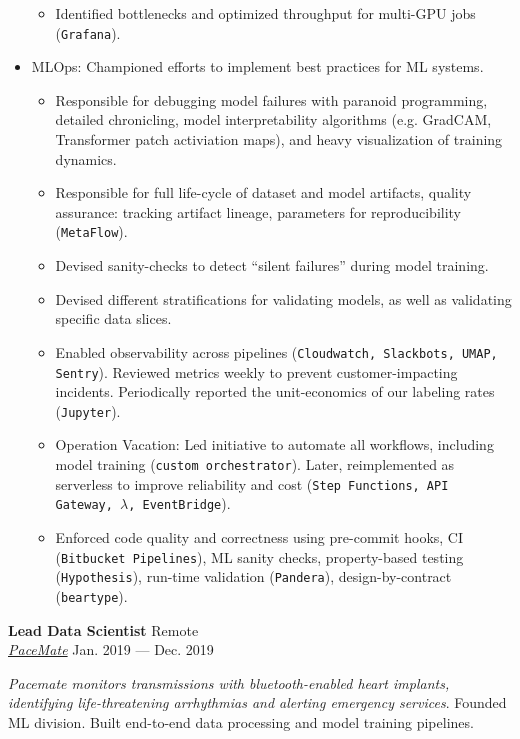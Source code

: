 \documentclass[a4paper,12pt]{article}
\newcommand{\ressubheading}[4]{{\begin{minipage}{\textwidth}
                                    \textbf{#1} \hfill #2 \\
                                    \textit{#3} \hfill #4 \\
\end{minipage}}}
\begin{document}
\begin{itemize}
\begin{itemize}
            \item Identified bottlenecks and optimized throughput for multi-GPU jobs (\texttt{Grafana}).
        \end{itemize}
        \item MLOps: Championed efforts to implement best practices for ML systems.
        \begin{itemize}
            \item Responsible for debugging model failures with paranoid programming, detailed chronicling, model interpretability algorithms (e.g. GradCAM, Transformer patch activiation maps),  and heavy visualization of training dynamics.
            \item Responsible for full life-cycle of dataset and model artifacts, quality assurance:
            tracking artifact lineage, parameters for reproducibility (\texttt{MetaFlow}).
            \item Devised sanity-checks to detect ``silent failures'' during model training. 
            \item Devised different stratifications for validating models, as well as validating specific data slices. 
            \item Enabled observability across pipelines (\texttt{Cloudwatch, Slackbots, UMAP, Sentry}). Reviewed metrics weekly to prevent customer-impacting incidents. Periodically reported the unit-economics of our labeling rates (\texttt{Jupyter}).
            \item Operation Vacation: Led initiative to automate all workflows, including model training (\texttt{custom orchestrator}). Later, reimplemented as serverless to improve reliability and cost (\texttt{Step Functions, API Gateway, $\lambda$, EventBridge}).
            \item Enforced code quality and correctness using pre-commit hooks, CI (\texttt{Bitbucket Pipelines}), ML sanity checks, property-based testing (\texttt{Hypothesis}), run-time validation (\texttt{Pandera}), design-by-contract (\texttt{beartype}).
        \end{itemize}

    \end{itemize}


    \ressubheading{Lead Data Scientist}{Remote}{\href{https://pacemate.com/}{PaceMate}}{Jan. 2019 --- Dec. 2019}

    \vspace{-6pt} \textit{Pacemate monitors transmissions with bluetooth-enabled heart implants, identifying life-threatening arrhythmias and alerting emergency services}. Founded ML division. Built end-to-end data processing and model training pipelines.
\end{document}
